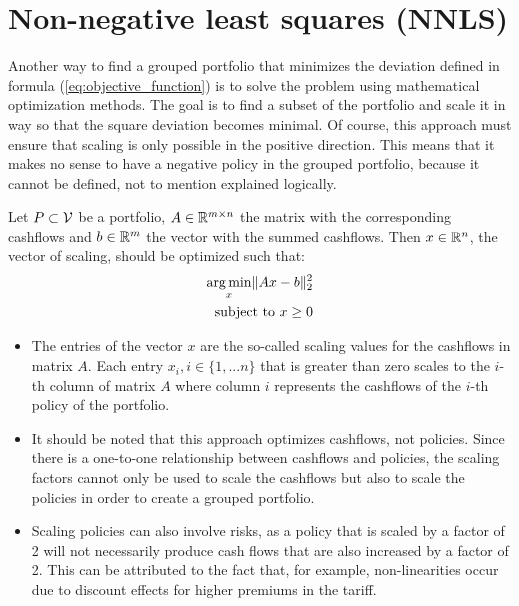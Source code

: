 

\chapter{Non-negative least squares (NNLS)}
\label{cha:NNLS}

Another way to find a grouped portfolio that minimizes the deviation defined in formula (\ref{eq:objective_function}) is to solve the problem using mathematical optimization methods. The goal is to find a subset of the portfolio and scale it in way so that the square deviation becomes minimal. Of course, this approach must ensure that scaling is only possible in the positive direction. This means that it makes no sense to have a negative policy in the grouped portfolio, because it cannot be defined, not to mention explained logically. 

\begin{definition}\label{def:NNLS}
	Let $P \subset \mathcal{V}$ be a portfolio, $A \in \mathbb{R}^{m \times n}$ the matrix with the corresponding cashflows and $b \in \mathbb{R}^m$ the vector with the summed cashflows. Then $x \in \mathbb{R}^n$, the vector of scaling, should be optimized such that:  
	\begin{equation}\label{eq:NNLS}
		\begin{aligned}
			\operatorname*{arg\,min}_x \lVert Ax -b \rVert_2^2 \\
			\text{subject to } x \geq 0
		\end{aligned}
	\end{equation}
\end{definition}

\begin{remark}
	\leavevmode %
	\makeatletter
	\@nobreaktrue
	\makeatother
	\begin{itemize}
		\item 	The entries of the vector $x$ are the so-called scaling values for the cashflows in matrix $A$. Each entry $x_i, i \in \{1,...n\}$ that is greater than zero scales to the $i$-th column of matrix $A$ where column $i$ represents the cashflows of the $i$-th policy of the portfolio.
		\item 	It should be noted that this approach optimizes cashflows, not policies. Since there is a one-to-one relationship between cashflows and policies, the scaling factors cannot only be used to scale the cashflows but also to scale the policies in order to create a grouped portfolio. 
		\item 	Scaling policies can also involve risks, as a policy that is scaled by a factor of 2 will not necessarily produce cash flows that are also increased by a factor of 2. This can be attributed to the fact that, for example, non-linearities occur due to discount effects for higher premiums in the tariff.
	\end{itemize}
\end{remark}

